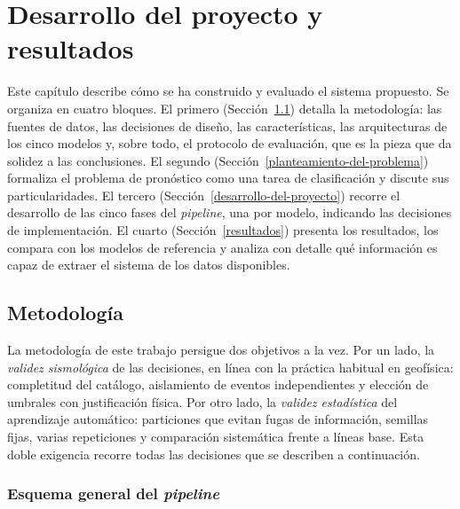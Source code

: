 
\cleardoublepage

\chapter{Desarrollo del proyecto y resultados}
\label{desarrollo-del-proyecto-y-resultados}

Este capítulo describe cómo se ha construido y evaluado el sistema propuesto. Se organiza
en cuatro bloques. El primero (Sección~\ref{metodologia}) detalla la metodología: las
fuentes de datos, las decisiones de diseño, las características, las arquitecturas de los
cinco modelos y, sobre todo, el protocolo de evaluación, que es la pieza que da solidez a
las conclusiones. El segundo (Sección~\ref{planteamiento-del-problema}) formaliza el
problema de pronóstico como una tarea de clasificación y discute sus particularidades. El
tercero (Sección~\ref{desarrollo-del-proyecto}) recorre el desarrollo de las cinco fases
del \textit{pipeline}, una por modelo, indicando las decisiones de implementación. El
cuarto (Sección~\ref{resultados}) presenta los resultados, los compara con los modelos de
referencia y analiza con detalle qué información es capaz de extraer el sistema de los
datos disponibles.

\section{Metodología}
\label{metodologia}

La metodología de este trabajo persigue dos objetivos a la vez. Por un lado, la
\emph{validez sismológica} de las decisiones, en línea con la práctica habitual en
geofísica: completitud del catálogo, aislamiento de eventos independientes y elección de
umbrales con justificación física. Por otro lado, la \emph{validez estadística} del
aprendizaje automático: particiones que evitan fugas de información, semillas fijas, varias
repeticiones y comparación sistemática frente a líneas base. Esta doble exigencia recorre
todas las decisiones que se describen a continuación.

\subsection{Esquema general del \textit{pipeline}}
\label{md-pipeline}

